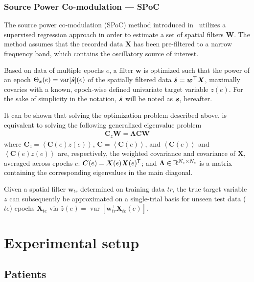 \documentclass[10pt,a4paper, twocolumn]{article}
\providecommand{\mat}[1]{{\bm {#1}}}
\begin{document}
\subsubsection{Source Power Co-modulation --- SPoC}
\label{par:spoc}
The source power co-modulation (SPoC) method introduced in~\cite{dahne2014spoc} utilizes a supervised regression approach in order to estimate a set of spatial filters $\mat{W}$. The method assumes that the recorded data $\mat{X}$ has been pre-filtered to a narrow frequency band, which contains the oscillatory source of interest. 

Based on data of multiple epochs $e$, a filter $\mat{w}$ is optimized such that the power of an epoch $\Theta_x(e) = \operatorname{var}[\hat{{\bm {s}}}](e)$ of the spatially filtered data $\hat{\ve{s}}=\mat{w}^\top\mat{X}$, maximally covaries with a known, epoch-wise defined univariate target variable $z(e)$. For the sake of simplicity in the notation, $\hat{{\bm {s}}}$ will be noted as ${\bm {s}}$, hereafter.
 
It can be shown that solving the optimization problem described above, is equivalent to solving the following generalized eigenvalue problem
\begin{align}\label{eq:eig_spoc}
\mat{C}_z\mat{W} = \mat{\Lambda}\mat{C}\mat{W}
\end{align}
where $\mat{C}_z = \left<\mat{C}(e)z(e)\right>$, $\mat{C} = \left<\mat{C}(e)\right>$, and $\left<\mat{C}(e)\right>$ and $\left<\mat{C}(e)z(e)\right>$ are, respectively, the weighted covariance and covariance of $\mat{X}$, averaged across epochs $e$: $\mat{C}(e) = \mat{X}(e)\mat{X}(e)^\T$; and $\mat{\Lambda} \in \Real^{N_c\times N_c}$ is a matrix containing the corresponding eigenvalues in the main diagonal.

Given a spatial filter $\mat{w}_{tr}$ determined on training data $tr$, the true target variable $z$ can subsequently be approximated on a single-trial basis for unseen test data ($te$) epochs $\mat{X}_{te}$ via $\hat{z}(e) = \operatorname{var}[\mat{w}_{tr}^\top\mat{X}_{te}(e)]$. 


\section{Experimental setup}
\subsection{Patients}
\end{document}
